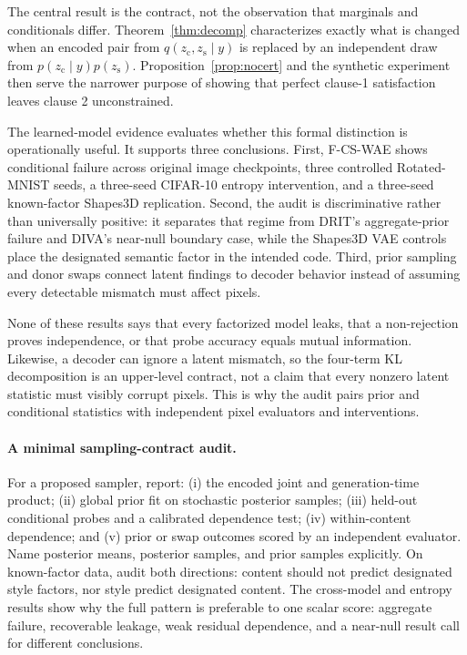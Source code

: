 \documentclass{article}
\newcommand{\zc}{z_{\mathrm{c}}}
\newcommand{\zs}{z_{\mathrm{s}}}
\begin{document}
The central result is the contract, not the observation that marginals and
conditionals differ.  Theorem~\ref{thm:decomp} characterizes exactly what is
changed when an encoded pair from $q(\zc,\zs\mid y)$ is replaced by an
independent draw from $p(\zc\mid y)p(\zs)$.  Proposition~\ref{prop:nocert} and
the synthetic experiment then serve the narrower purpose of showing that
perfect clause-1 satisfaction leaves clause 2 unconstrained.

The learned-model evidence evaluates whether this formal distinction is
operationally useful.  It supports three conclusions.  First, F-CS-WAE shows
conditional failure across original image checkpoints, three controlled
Rotated-MNIST seeds, a three-seed CIFAR-10 entropy intervention, and a
three-seed known-factor Shapes3D replication.  Second, the audit is
discriminative rather than universally positive: it separates that regime
from DRIT's aggregate-prior failure and DIVA's near-null boundary case, while
the Shapes3D VAE controls place the designated semantic factor in the intended
code.  Third, prior sampling and donor swaps connect latent findings to decoder
behavior instead of assuming every detectable mismatch must affect pixels.

None of these results says that every factorized model leaks, that a
non-rejection proves independence, or that probe accuracy equals mutual
information.  Likewise, a decoder can ignore a latent mismatch, so the
four-term KL decomposition is an upper-level contract, not a claim that every
nonzero latent statistic must visibly corrupt pixels.  This is why the audit
pairs prior and conditional statistics with independent pixel evaluators and
interventions.

\paragraph{A minimal sampling-contract audit.}
For a proposed sampler, report: (i) the encoded joint and generation-time
product; (ii) global prior fit on stochastic posterior samples; (iii) held-out
conditional probes and a calibrated dependence test; (iv) within-content
dependence; and (v) prior or swap outcomes scored by an independent evaluator.
Name posterior means, posterior samples, and prior samples explicitly.  On
known-factor data, audit both directions: content should not predict designated
style factors, nor style predict designated content.  The cross-model and
entropy results show why the full pattern is preferable to one scalar score:
aggregate failure, recoverable leakage, weak residual dependence, and a
near-null result call for different conclusions.
\end{document}
